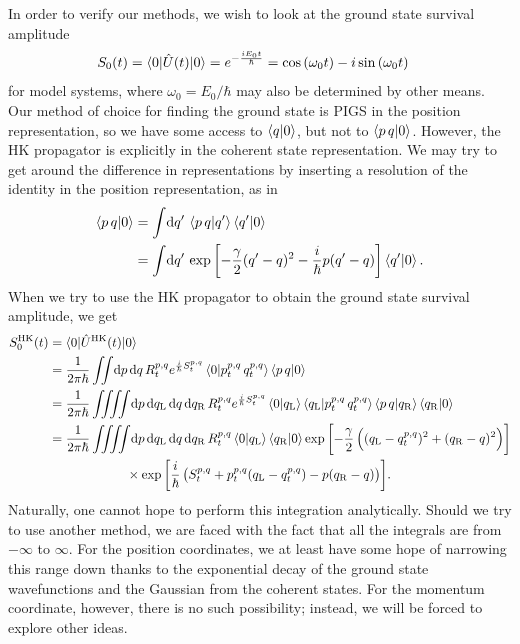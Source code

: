 In order to verify our methods, we wish to look at the ground state survival amplitude
\begin{align}
	S_0(t)
	&= \braket{0 | \hat{U}(t) | 0}
	= e^{-\frac{i E_0 t}{\hbar}}
	= \cos{(\omega_0 t)} - i \sin{(\omega_0 t)}
\end{align}
for model systems, where $\omega_0 = E_0 / \hbar$ may also be determined by other means.
Our method of choice for finding the ground state is PIGS in the position representation, so we have some access to $\braket{q | 0}$, but not to $\braket{p \, q | 0}$.
However, the HK propagator is explicitly in the coherent state representation.
We may try to get around the difference in representations by inserting a resolution of the identity in the position representation, as in
\begin{subequations}
\begin{align}
	\braket{p \, q | 0}
	&= \int\! \dif q' \, \braket{p \, q | q'} \braket{q' | 0} \\
	&= \int\! \dif q' \, \expb{-\frac{\gamma}{2} (q' - q)^2 - \frac{i}{\hbar} p (q' - q)} \braket{q' | 0}.
\end{align}
\end{subequations}
When we try to use the HK propagator to obtain the ground state survival amplitude, we get
\begin{subequations}
\begin{align}
	S_0\hk(t)
	&= \braket{0 | \hat{U}\hk(t) | 0} \\
	&= \frac{1}{2 \pi \hbar} \iint\! \dif p \dif q \,
			R\coh{p}{q}_t e^{\frac{i}{\hbar} S\coh{p}{q}_t}
			\braket{0 | p\coh{p}{q}_t \, q\coh{p}{q}_t} \braket{p \, q | 0} \\
	&= \frac{1}{2 \pi \hbar} \iiiint\! \dif p \dif q\LLup \dif q \dif q\RRup \,
			R\coh{p}{q}_t e^{\frac{i}{\hbar} S\coh{p}{q}_t}
			\braket{0 | q\LLup} \braket{q\LLup | p\coh{p}{q}_t \, q\coh{p}{q}_t}
			\braket{p \, q | q\RRup} \braket{q\RRup | 0} \\
	&= \frac{1}{2 \pi \hbar} \iiiint\! \dif p \dif q\LLup \dif q \dif q\RRup \,
			R\coh{p}{q}_t \braket{0 | q\LLup} \braket{q\RRup | 0}
			\expb{-\frac{\gamma}{2} \left( (q\LLup - q\coh{p}{q}_t)^2 + (q\RRup - q)^2 \right)} \notag \\
	&\qquad\qquad\qquad\times
			\expb{\frac{i}{\hbar} \left( S\coh{p}{q}_t + p\coh{p}{q}_t (q\LLup - q\coh{p}{q}_t) - p (q\RRup - q) \right)}.
				\label{eq:survival-hk}
\end{align}
\end{subequations}
Naturally, one cannot hope to perform this integration analytically.
Should we try to use another method, we are faced with the fact that all the integrals are from $-\infty$ to $\infty$.
For the position coordinates, we at least have some hope of narrowing this range down thanks to the exponential decay of the ground state wavefunctions and the Gaussian from the coherent states.
For the momentum coordinate, however, there is no such possibility; instead, we will be forced to explore other ideas.




